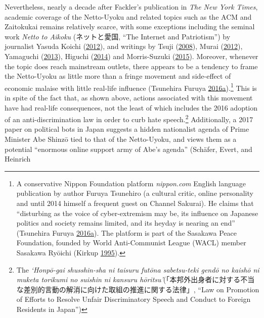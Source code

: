 \documentclass[10pt,british,A4paper,,openany]{memoir}
\begin{document}
Nevertheless, nearly a decade after Fackler's publication in \emph{The
New York Times}, academic coverage of the Netto-Uyoku and related topics
such as the ACM and Zaitokukai remains relatively scarce, with some
exceptions including the seminal work \emph{Netto to Aikoku}
(ネットと愛国, ``The Internet and Patriotism'') by journalist Yasuda
Koichi (\protect\hyperlink{ref-yasuda_eng:_2012}{2012}), and writings by
Tsuji (\protect\hyperlink{ref-tsuji_eng:_2008}{2008}), Murai
(\protect\hyperlink{ref-murai_net_2012}{2012}), Yamaguchi
(\protect\hyperlink{ref-yamaguchi_xenophobia_2013}{2013}), Higuchi
(\protect\hyperlink{ref-higuchi_japans_2014}{2014}) and Morris-Suzuki
(\protect\hyperlink{ref-morris-suzuki_beyond_2015}{2015}). Moreover,
whenever the topic does reach mainstream outlets, there appears to be a
tendency to frame the Netto-Uyoku as little more than a fringe movement
and side-effect of economic malaise with little real-life influence
(Tsunehira Furuya
\protect\hyperlink{ref-furuya_roots_2016}{2016}\protect\hyperlink{ref-furuya_roots_2016}{a}).\footnote{A
  conservative Nippon Foundation platform \emph{nippon.com} English
  language publication by author Furuya Tsunehiro (a cultural critic,
  online personality and until 2014 himself a frequent guest on Channel
  Sakurai). He claims that ``disturbing as the voice of cyber-extremism
  may be, its influence on Japanese politics and society remains
  limited, and its heyday is nearing an end'' (Tsunehira Furuya
  \protect\hyperlink{ref-furuya_roots_2016}{2016}\protect\hyperlink{ref-furuya_roots_2016}{a}).
  The platform is part of the Sasakawa Peace Foundation, founded by
  World Anti-Communist League (WACL) member Sasakawa Ryōichi (Kirkup
  \protect\hyperlink{ref-kirkup_obituary:_1995}{1995}).} This is in
spite of the fact that, as shown above, actions associated with this
movement have had real-life consequences, not the least of which
includes the 2016 adoption of an anti-discrimination law in order to
curb hate speech.\footnote{The \emph{`Honpō-gai shusshin-sha ni taisuru
  futōna sabetsu-teki gendō no kaishō ni muketa torikumi no suishin ni
  kansuru
  hōritsu'}(「本邦外出身者に対する不当な差別的言動の解消に向けた取組の推進に関する法律」,
  ``Law on Promotion of Efforts to Resolve Unfair Discriminatory Speech
  and Conduct to Foreign Residents in Japan'')} Additionally, a 2017
paper on political bots in Japan suggests a hidden nationalist agenda of
Prime Minister Abe Shinzō tied to that of the Netto-Uyoku, and views
them as a potential ``enormous online support army of Abe's agenda''
(Schäfer, Evert, and Heinrich
\end{document}
